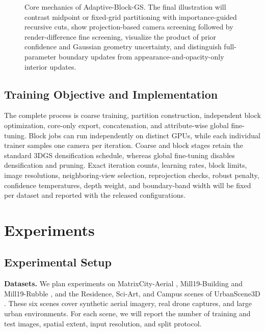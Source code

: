 \documentclass[conference]{IEEEtran}
\newcommand{\method}{Adaptive-Block-GS}
\begin{document}
\begin{figure}[t]
    \centering
    \caption{Core mechanics of \method. The final illustration will contrast midpoint or fixed-grid partitioning with importance-guided recursive cuts, show projection-based camera screening followed by render-difference fine screening, visualize the product of prior confidence and Gaussian geometry uncertainty, and distinguish full-parameter boundary updates from appearance-and-opacity-only interior updates.}
    \label{fig:mechanics}
\end{figure}

\subsection{Training Objective and Implementation}

The complete process is coarse training, partition construction, independent block optimization, core-only export, concatenation, and attribute-wise global fine-tuning. Block jobs can run independently on distinct GPUs, while each individual trainer samples one camera per iteration. Coarse and block stages retain the standard 3DGS densification schedule, whereas global fine-tuning disables densification and pruning. Exact iteration counts, learning rates, block limits, image resolutions, neighboring-view selection, reprojection checks, robust penalty, confidence temperatures, depth weight, and boundary-band width will be fixed per dataset and reported with the released configurations. %

\section{Experiments}

\subsection{Experimental Setup}

\textbf{Datasets.} We plan experiments on MatrixCity-Aerial \cite{li2023matrixcity}, Mill19-Building and Mill19-Rubble \cite{turki2022meganerf}, and the Residence, Sci-Art, and Campus scenes of UrbanScene3D \cite{lin2022urbanscene3d}. These six scenes cover synthetic aerial imagery, real drone captures, and large urban environments. For each scene, we will report the number of training and test images, spatial extent, input resolution, and split protocol.
\end{document}
